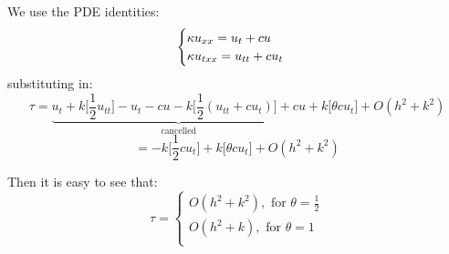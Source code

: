\documentclass[12pt]{article}
\newcommand{\cancels}[1]{\underbrace{#1}_\textrm{cancelled}}
\begin{document}
We use the PDE identities:
$$
	\begin{cases}
		\kappa u_{xx} = u_t + cu \\
		\kappa u_{txx} = u_{tt} + cu_t
	\end{cases}
$$ substituting in:
$$
	\tau =
	\cancels{u_t + k \big[ \frac12 u_{tt} \big] - u_t - cu - k\big[ \frac12 (u_{tt} + cu_t) \big] + cu} + k\big[ \theta cu_t \big] + O(h^2 + k^2)
$$
$$
	= - k \big[ \frac12 cu_t \big] + k \big[ \theta cu_t \big] + O(h^2 + k^2)
$$

Then it is easy to see that:
$$
	\tau = 
	\begin{cases}
		O(h^2 + k^2), \text{ for $\theta = \frac12$} \\
		O(h^2 + k), \text{ for $\theta = 1$} \\
	\end{cases}
$$








\end{document}

